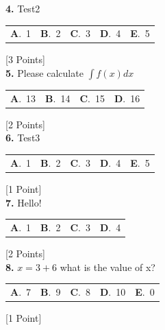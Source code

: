 \documentclass[12pt]{article}
\newcommand{\choice}[2]{\textbf{#1}.~#2}
\begin{document}
\noindent \textbf{\textenglish{4.}} {\textenglish{Test2}}

\begin{tabularx}{\linewidth}{@{}*{5}{Y}@{}}
\choice{A}{{{\textenglish{1}}}} & \choice{B}{{{\textenglish{2}}}} & \choice{C}{{{\textenglish{3}}}} & \choice{D}{{{\textenglish{4}}}} & \choice{E}{{{\textenglish{5}}}} \\
\end{tabularx}
\hfill {\textenglish{[3 Points]}}\\[0.5em]

\noindent \textbf{\textenglish{5.}} {\textenglish{Please calculate }}\(\int f(x)dx\)

\begin{tabularx}{\linewidth}{@{}*{4}{Y}@{}}
\choice{A}{{{\textenglish{13}}}} & \choice{B}{{{\textenglish{14}}}} & \choice{C}{{{\textenglish{15}}}} & \choice{D}{{{\textenglish{16}}}} \\
\end{tabularx}
\hfill {\textenglish{[2 Points]}}\\[0.5em]

\noindent \textbf{\textenglish{6.}} {\textenglish{Test3}}

\begin{tabularx}{\linewidth}{@{}*{5}{Y}@{}}
\choice{A}{{{\textenglish{1}}}} & \choice{B}{{{\textenglish{2}}}} & \choice{C}{{{\textenglish{3}}}} & \choice{D}{{{\textenglish{4}}}} & \choice{E}{{{\textenglish{5}}}} \\
\end{tabularx}
\hfill {\textenglish{[1 Point]}}\\[0.5em]

\noindent \textbf{\textenglish{7.}} {\textenglish{Hello!}}

\begin{tabularx}{\linewidth}{@{}*{4}{Y}@{}}
\choice{A}{{{\textenglish{1}}}} & \choice{B}{{{\textenglish{2}}}} & \choice{C}{{{\textenglish{3}}}} & \choice{D}{{{\textenglish{4}}}} \\
\end{tabularx}
\hfill {\textenglish{[2 Points]}}\\[0.5em]

\noindent \textbf{\textenglish{8.}} \(x=3+6 \){\textenglish{ what is the value of x?}}

\begin{tabularx}{\linewidth}{@{}*{5}{Y}@{}}
\choice{A}{{{\textenglish{7}}}} & \choice{B}{{{\textenglish{9}}}} & \choice{C}{{{\textenglish{8}}}} & \choice{D}{{{\textenglish{10}}}} & \choice{E}{{{\textenglish{0}}}} \\
\end{tabularx}
\hfill {\textenglish{[1 Point]}}\\[0.5em]
\end{document}
